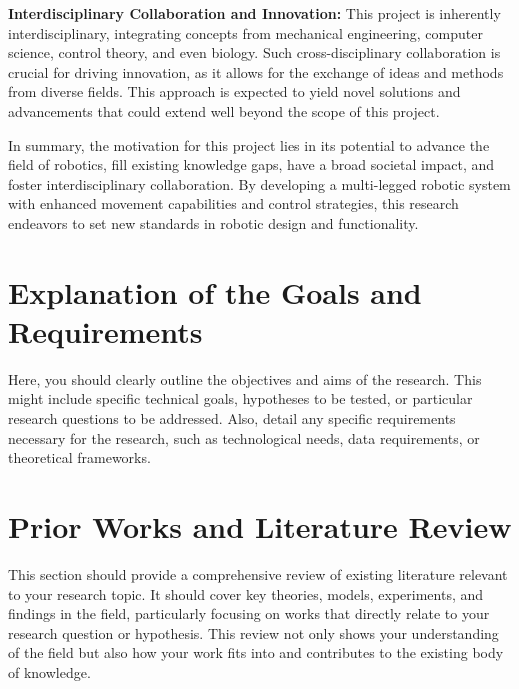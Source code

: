 \textbf{Interdisciplinary Collaboration and Innovation:} This project is inherently interdisciplinary, integrating concepts from mechanical engineering, computer science, control theory, and even biology. Such cross-disciplinary collaboration is crucial for driving innovation, as it allows for the exchange of ideas and methods from diverse fields. This approach is expected to yield novel solutions and advancements that could extend well beyond the scope of this project.

In summary, the motivation for this project lies in its potential to advance the field of robotics, fill existing knowledge gaps, have a broad societal impact, and foster interdisciplinary collaboration. By developing a multi-legged robotic system with enhanced movement capabilities and control strategies, this research endeavors to set new standards in robotic design and functionality.

\section{Explanation of the Goals and Requirements}
Here, you should clearly outline the objectives and aims of the research. This might include specific technical goals, hypotheses to be tested, or particular research questions to be addressed. Also, detail any specific requirements necessary for the research, such as technological needs, data requirements, or theoretical frameworks.

\section{Prior Works and Literature Review}
This section should provide a comprehensive review of existing literature relevant to your research topic. It should cover key theories, models, experiments, and findings in the field, particularly focusing on works that directly relate to your research question or hypothesis. This review not only shows your understanding of the field but also how your work fits into and contributes to the existing body of knowledge.
